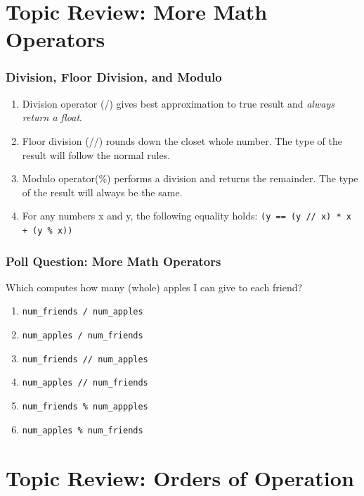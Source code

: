 \documentclass{beamer}
\begin{document}
\section{Topic Review: More Math Operators}

%
%
%
\begin{frame}[fragile]
  \frametitle{Division, Floor Division, and Modulo}
  \begin{enumerate}
    \item Division operator (/) gives best approximation to true result and \textit{always return a float}.
    \item Floor division (//) rounds down the closet whole number. The type of the result will follow the normal rules.
    \item Modulo operator(\%) performs a division and returns the remainder. The type of the result will always be the same.
    \item For any numbers x and y, the following equality holds: \lstinline{(y == (y // x) * x + (y % x))}
  \end{enumerate}
\end{frame}

%
%
%
\begin{frame}[fragile]
  \frametitle{Poll Question: More Math Operators}
  \vfill
  Which computes how many (whole) apples I can give to each friend?
  \begin{enumerate}
    \item \lstinline{num_friends / num_apples}
    \item \lstinline{num_apples / num_friends}
    \item \lstinline{num_friends // num_apples}
    \item \lstinline{num_apples // num_friends}
    \item \lstinline{num_friends % num_appples}
    \item \lstinline{num_apples % num_friends}
  \end{enumerate}
\end{frame}


\section{Topic Review: Orders of Operation}
\end{document}
